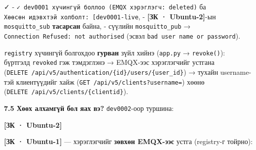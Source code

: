 ✓
- \texttt{✓\ dev0001\ хүчингүй\ боллоо\ (EMQX\ хэрэглэгч:\allowbreak{}\ deleted)} ба \texttt{Хөөсөн\ идэвхтэй\ холболт:\ {[}\textquotesingle{}dev0001-live\textquotesingle{}{]}},
- \textbf{{[}ЗК · Ubuntu-2{]}}-ын \texttt{mosquitto\_sub} \textbf{тасарсан} байна,
- сүүлийн \texttt{mosquitto\_pub} → \texttt{Connection\ Refused:\allowbreak{}\ not\ authorised} (эсвэл \texttt{bad\ user\ name\ or\ password}).

\texttt{registry} хүчингүй болгохдоо \textbf{гурван} зүйл хийнэ (\texttt{app.py} → \texttt{revoke()}): бүртгэлд \texttt{revoked} гэж тэмдэглэнэ → EMQX-ээс хэрэглэгчийг устгана (\texttt{DELETE\ /\allowbreak{}api/\allowbreak{}v5/\allowbreak{}authentication/\allowbreak{}\{id\}/users/\{user\_id\}}) → тухайн username-тэй клиентүүдийг хайж (\texttt{GET\ /\allowbreak{}api/\allowbreak{}v5/\allowbreak{}clients?\allowbreak{}username=\allowbreak{}}) хөөнө (\texttt{DELETE\ /\allowbreak{}api/\allowbreak{}v5/\allowbreak{}clients/\allowbreak{}\{clientid\}}).

\textbf{7.5 Хөөх алхамгүй бол яах вэ?} \texttt{dev0002}-оор туршина:

\textbf{{[}ЗК · Ubuntu-2{]}}

\begin{Shaded}
\begin{Highlighting}[]
 \KeywordTok{|} \VariableTok{)}
\end{Highlighting}
\end{Shaded}

\textbf{{[}ЗК · Ubuntu-1{]}} --- хэрэглэгчийг \textbf{зөвхөн EMQX-ээс} устга (registry-г тойрно):

\begin{Shaded}
\begin{Highlighting}[]
\StringTok{:}\KeywordTok{\textbackslash{}}
\StringTok{:}  \KeywordTok{\textbackslash{}}
  \KeywordTok{|}  
\end{Highlighting}
\end{Shaded}

